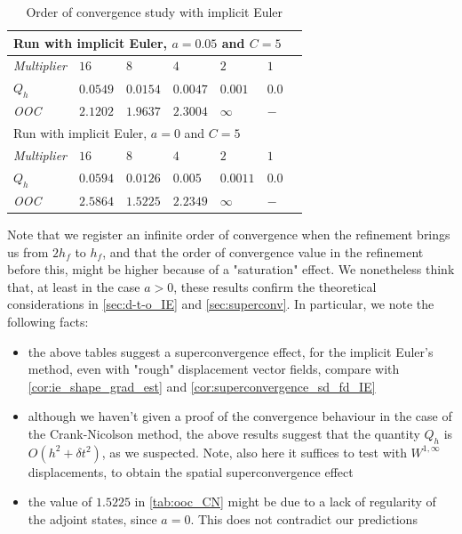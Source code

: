 \documentclass[english,a4paper,9pt,oneside]{scrbook}	%
\theoremstyle{break}
\theoremstyle{remark}
\begin{document}
\begin{table}[h]
\centering
\begin{tabular}{lllllll}
\hline
\multicolumn{6}{l}{Run with implicit Euler, $a = 0.05$ and $C=5$} \\ \hline
\textit{Multiplier} & $16$ & $8$ & $4$ & $2$ & $1$\\ \hline
$Q_h$ & $0.0549$ & $0.0154$ & $0.0047$ & $0.001$ & $0.0$\\ \hline
\textit{OOC} & $2.1202$ & $1.9637$ & $2.3004$ & $\infty$ & $-$ \\ \hline
\hline
\multicolumn{6}{l}{Run with implicit Euler, $a = 0$ and $C=5$} \\ \hline
\textit{Multiplier} & $16$ & $8$ & $4$ & $2$ & $1$\\ \hline
$Q_h$ & $0.0594$ & $0.0126$ & $0.005$ & $0.0011$ & $0.0$\\ \hline
\textit{OOC} & $2.5864$ & $1.5225$ & $2.2349$ & $\infty$ & $-$ \\ \hline
\end{tabular}
\caption{Order of convergence study with implicit Euler}\label{tab:ooc_IE}
\end{table}

Note that we register an infinite order of convergence when the refinement brings us from $2h_f$ to $h_f$, and that the order of convergence value in the refinement before this, might be higher because of a "saturation" effect. We nonetheless think that, at least in the case $a>0$, these results confirm the theoretical considerations in  \cref{sec:d-t-o_IE} and \cref{sec:superconv}. In particular, we note the following facts:

\begin{itemize}
	\item the above tables suggest a superconvergence effect, for the implicit Euler's method, even with "rough" displacement vector fields, compare with  \cref{cor:ie_shape_grad_est} and \cref{cor:superconvergence_sd_fd_IE}
	\item although we haven't given a proof of the convergence behaviour in the case of the Crank-Nicolson method, the above results suggest that the quantity $Q_h$ is $O(h^2+\delta t^2)$, as we suspected. Note, also here it suffices to test with $W^{1,\infty}$ displacements, to obtain the spatial superconvergence effect
	\item the value of $1.5225$ in \cref{tab:ooc_CN} might be due to a lack of regularity of the adjoint states, since $a=0$. This does not contradict our predictions
\end{itemize}
\end{document}
